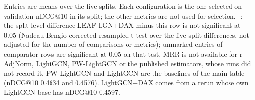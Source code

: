\begin{table}[tbp]
\begin{minipage}{\linewidth}\raggedright\footnotesize Entries are means over the five splits. Each configuration is the one selected on validation nDCG@10 in its split; the other metrics are not used for selection. $^{\dagger}$: the split-level difference LEAF-LGN+DAX minus this row is not significant at 0.05 (Nadeau-Bengio corrected resampled t test over the five split differences, not adjusted for the number of comparisons or metrics); unmarked entries of comparator rows are significant at 0.05 on that test. MRR is not available for r-AdjNorm, LightGCN, PW-LightGCN or the published estimators, whose runs did not record it. PW-LightGCN and LightGCN are the baselines of the main table (nDCG@10 0.4634 and 0.4576). LightGCN+DAX comes from a rerun whose own LightGCN base has nDCG@10 0.4597.\end{minipage}
\end{table}
